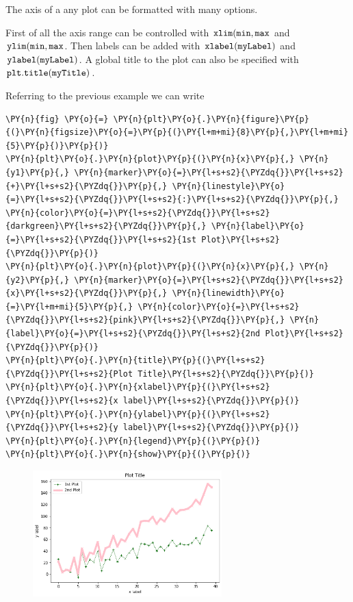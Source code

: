 The axis of a any plot can be formatted with many options.

First of all the axis range can be controlled with
\(\tt{xlim(min, max}\) and \(\tt{ylim(min, max}\). Then labels can be
added with \(\tt{xlabel(myLabel)}\) and \(\tt{ylabel(myLabel)}\). A
global title to the plot can also be specified with
\(\tt{plt.title(myTitle)}\).

Referring to the previous example we can write

\begin{tcolorbox}[breakable, size=fbox, boxrule=1pt, pad at break*=1mm,colback=cellbackground, colframe=cellborder]
\begin{Verbatim}[commandchars=\\\{\}]
\PY{n}{fig} \PY{o}{=} \PY{n}{plt}\PY{o}{.}\PY{n}{figure}\PY{p}{(}\PY{n}{figsize}\PY{o}{=}\PY{p}{(}\PY{l+m+mi}{8}\PY{p}{,}\PY{l+m+mi}{5}\PY{p}{)}\PY{p}{)}
\PY{n}{plt}\PY{o}{.}\PY{n}{plot}\PY{p}{(}\PY{n}{x}\PY{p}{,} \PY{n}{y1}\PY{p}{,} \PY{n}{marker}\PY{o}{=}\PY{l+s+s2}{\PYZdq{}}\PY{l+s+s2}{+}\PY{l+s+s2}{\PYZdq{}}\PY{p}{,} \PY{n}{linestyle}\PY{o}{=}\PY{l+s+s2}{\PYZdq{}}\PY{l+s+s2}{:}\PY{l+s+s2}{\PYZdq{}}\PY{p}{,} \PY{n}{color}\PY{o}{=}\PY{l+s+s2}{\PYZdq{}}\PY{l+s+s2}{darkgreen}\PY{l+s+s2}{\PYZdq{}}\PY{p}{,} \PY{n}{label}\PY{o}{=}\PY{l+s+s2}{\PYZdq{}}\PY{l+s+s2}{1st Plot}\PY{l+s+s2}{\PYZdq{}}\PY{p}{)}
\PY{n}{plt}\PY{o}{.}\PY{n}{plot}\PY{p}{(}\PY{n}{x}\PY{p}{,} \PY{n}{y2}\PY{p}{,} \PY{n}{marker}\PY{o}{=}\PY{l+s+s2}{\PYZdq{}}\PY{l+s+s2}{x}\PY{l+s+s2}{\PYZdq{}}\PY{p}{,} \PY{n}{linewidth}\PY{o}{=}\PY{l+m+mi}{5}\PY{p}{,} \PY{n}{color}\PY{o}{=}\PY{l+s+s2}{\PYZdq{}}\PY{l+s+s2}{pink}\PY{l+s+s2}{\PYZdq{}}\PY{p}{,} \PY{n}{label}\PY{o}{=}\PY{l+s+s2}{\PYZdq{}}\PY{l+s+s2}{2nd Plot}\PY{l+s+s2}{\PYZdq{}}\PY{p}{)}
\PY{n}{plt}\PY{o}{.}\PY{n}{title}\PY{p}{(}\PY{l+s+s2}{\PYZdq{}}\PY{l+s+s2}{Plot Title}\PY{l+s+s2}{\PYZdq{}}\PY{p}{)}
\PY{n}{plt}\PY{o}{.}\PY{n}{xlabel}\PY{p}{(}\PY{l+s+s2}{\PYZdq{}}\PY{l+s+s2}{x label}\PY{l+s+s2}{\PYZdq{}}\PY{p}{)}
\PY{n}{plt}\PY{o}{.}\PY{n}{ylabel}\PY{p}{(}\PY{l+s+s2}{\PYZdq{}}\PY{l+s+s2}{y label}\PY{l+s+s2}{\PYZdq{}}\PY{p}{)}
\PY{n}{plt}\PY{o}{.}\PY{n}{legend}\PY{p}{(}\PY{p}{)}
\PY{n}{plt}\PY{o}{.}\PY{n}{show}\PY{p}{(}\PY{p}{)}
\end{Verbatim}
\end{tcolorbox}

\begin{figure}[h]
	\centering
	\includegraphics[width=0.65\textwidth]{figures/matplotlib_19_0.png}
\end{figure}

